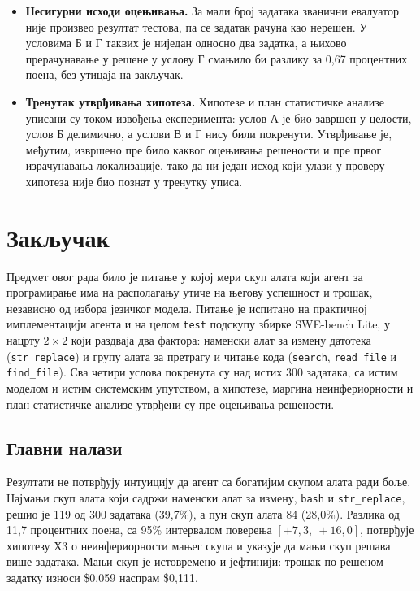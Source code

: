 \documentclass[12pt,a4paper]{report}
\begin{document}
\begin{itemize}
		од пет процентних поена није изведена из спољашњег стандарда, већ
		представља процену губитка који би био практично занемарљив у односу на
		смањење сложености скупа алата. Маргина је утврђена пре оцењивања
		решености. Добијени резултат није осетљив на њен избор, јер доња граница
		интервала лежи изнад нуле, тако да би закључак важио за сваку ненегативну
		маргину.
		\item \textbf{Несигурни исходи оцењивања.} За мали број задатака званични
		евалуатор није произвео резултат тестова, па се задатак рачуна као
		нерешен. У условима Б и Г таквих је ниједан односно два задатка, а
		њихово прерачунавање у решене у услову Г смањило би разлику за 0,67
		процентних поена, без утицаја на закључак.
		\item \textbf{Тренутак утврђивања хипотеза.} Хипотезе и план статистичке
		анализе уписани су током извођења експеримента: услов А је био завршен у
		целости, услов Б делимично, а услови В и Г нису били покренути.
		Утврђивање је, међутим, извршено пре било каквог оцењивања решености и
		пре првог израчунавања локализације, тако да ни један исход који улази у
		проверу хипотеза није био познат у тренутку уписа.
	\end{itemize}
	
	\chapter{Закључак}
	
	Предмет овог рада било је питање у којој мери скуп алата који агент за
	програмирање има на располагању утиче на његову успешност и трошак,
	независно од избора језичког модела. Питање је испитано на практичној
	имплементацији агента и на целом \texttt{test} подскупу збирке SWE-bench
	Lite, у нацрту $2 \times 2$ који раздваја два фактора: наменски алат за
	измену датотека (\texttt{str\_replace}) и групу алата за претрагу и читање
	кода (\texttt{search}, \texttt{read\_file} и \texttt{find\_file}). Сва четири
	услова покренута су над истих 300 задатака, са истим моделом и истим
	системским упутством, а хипотезе, маргина неинфериорности и план
	статистичке анализе утврђени су пре оцењивања решености.
	
	\section{Главни налази}
	
	Резултати не потврђују интуицију да агент са богатијим скупом алата ради
	боље. Најмањи скуп алата који садржи наменски алат за измену, \texttt{bash}
	и \texttt{str\_replace}, решио је 119 од 300 задатака (39,7\%), а пун скуп
	алата 84 (28,0\%). Разлика од 11,7 процентних поена, са 95\% интервалом
	поверења $[+7{,}3,\ +16{,}0]$, потврђује хипотезу Х3 о неинфериорности мањег
	скупа и указује да мањи скуп решава више задатака. Мањи скуп је истовремено
	и јефтинији: трошак по решеном задатку износи \$0,059 наспрам \$0,111.
	
\end{document}
